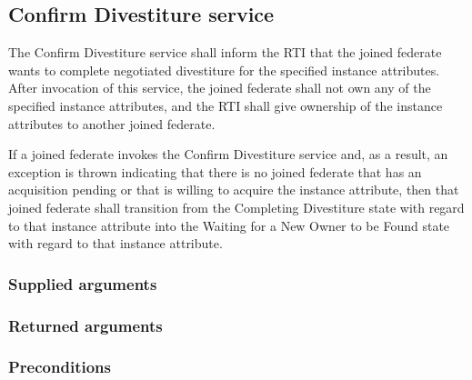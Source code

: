 \begin{compactstdpage}

    \subsection{Confirm Divestiture service}


    The Confirm Divestiture service shall inform the RTI that the joined federate wants to complete negotiated divestiture for the specified instance attributes. After invocation of this service, the joined federate shall not own any of the specified instance attributes, and the RTI shall give ownership of the instance attributes to another joined federate.


    If a joined federate invokes the Confirm Divestiture service and, as a result, an exception is thrown indicating that there is no joined federate that has an acquisition pending or that is willing to acquire the instance attribute, then that joined federate shall transition from the Completing Divestiture state with regard to that instance attribute into the Waiting for a New Owner to be Found state with regard to that instance attribute.

    \subsubsection{Supplied arguments}



    \subsubsection{Returned arguments}



    \subsubsection{Preconditions}




\end{compactstdpage}
